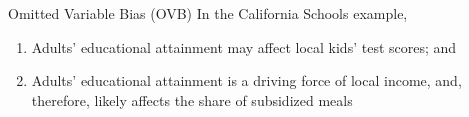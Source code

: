 \documentclass[notes,10pt, aspectratio=169]{beamer}
\begin{document}
\begin{frame}{Omitted Variable Bias (OVB)}
In the California Schools example,
\begin{enumerate}
    \item Adults' educational attainment may affect local kids' test scores; and
    \item Adults' educational attainment is a driving force of local income, and, therefore, likely affects the share of subsidized meals
\end{enumerate}

\begin{center}
\begin{figure}
\end{figure}
\end{center}
\end{frame}
\end{document}
